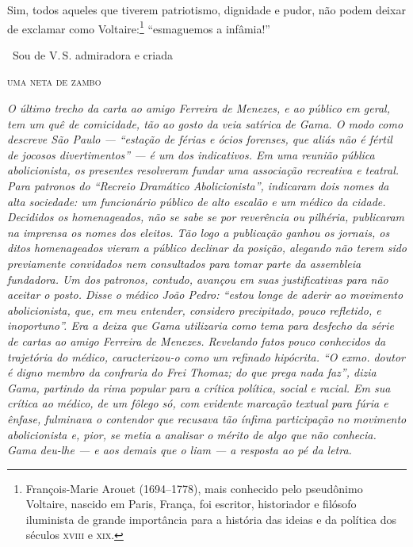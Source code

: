 {Sim, todos aqueles que tiverem patriotismo, dignidade e pudor, não podem
deixar de exclamar como Voltaire:\footnote{François-Marie Arouet
  (1694--1778), mais conhecido pelo pseudônimo Voltaire, nascido em
  Paris, França, foi escritor, historiador e filósofo iluminista de
  grande importância para a história das ideias e da política dos
  séculos \textsc{xviii} e \textsc{xix}.}
``esmaguemos a infâmia!''\medskip

\hfill\ Sou de V.\,S. admiradora e criada

\hfill\textsc{uma neta de zambo}


\begin{resumo}
\emph{O último trecho da carta ao amigo Ferreira de Menezes, e ao
público em geral, tem um quê de comicidade, tão ao gosto da veia
satírica de Gama. O modo como descreve São Paulo --- ``estação de férias e
ócios forenses, que aliás não é fértil de jocosos divertimentos'' --- é um
dos indicativos. Em uma reunião pública abolicionista, os presentes
resolveram fundar uma associação recreativa e teatral. Para patronos do
``Recreio Dramático Abolicionista'', indicaram dois nomes da alta
sociedade: um funcionário público de alto escalão e um médico da cidade.
Decididos os homenageados, não se sabe se por reverência ou pilhéria,
publicaram na imprensa os nomes dos eleitos. Tão logo a publicação
ganhou os jornais, os ditos homenageados vieram a público declinar da
posição, alegando não terem sido previamente convidados nem
consultados para tomar parte da assembleia fundadora. Um dos patronos,
contudo, avançou em suas justificativas para não aceitar o posto. Disse
o médico João Pedro: ``estou longe de aderir ao movimento abolicionista,
que, em meu entender, considero precipitado, pouco refletido, e
inoportuno''. Era a deixa que Gama utilizaria como tema para desfecho da
série de cartas ao amigo Ferreira de Menezes. Revelando fatos pouco
conhecidos da trajetória do médico, caracterizou-o como um refinado hipócrita. ``O exmo.
doutor é digno membro da confraria do Frei Thomaz; do que prega nada
faz'', dizia Gama, partindo da rima popular para a crítica política,
social e racial. Em sua crítica ao médico, de um fôlego só, com evidente
marcação textual para fúria e ênfase, fulminava o contendor que recusava tão ínfima
participação no movimento abolicionista e, pior, se metia a analisar o
mérito de algo que não conhecia. Gama deu-lhe --- e aos demais que o liam
--- a resposta ao pé da letra.}
\end{resumo}\pagebreak

}
